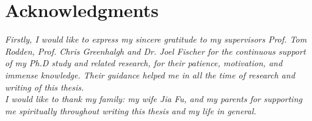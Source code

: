 


\bigskip

\begingroup
\let\clearpage\relax
\let\cleardoublepage\relax
\let\cleardoublepage\relax
\chapter*{Acknowledgments}

\emph{Firstly, I would like to express my sincere gratitude to my supervisors Prof. Tom Rodden, Prof. Chris Greenhalgh and Dr. Joel Fischer for the continuous support of my Ph.D study and related research, for their patience, motivation, and immense knowledge. Their guidance helped me in all the time of research and writing of this thesis.}\\

\emph{I would like to thank my family: my wife Jia Fu, and my parents for supporting me spiritually throughout writing this thesis and my life in general.}\\


\endgroup



